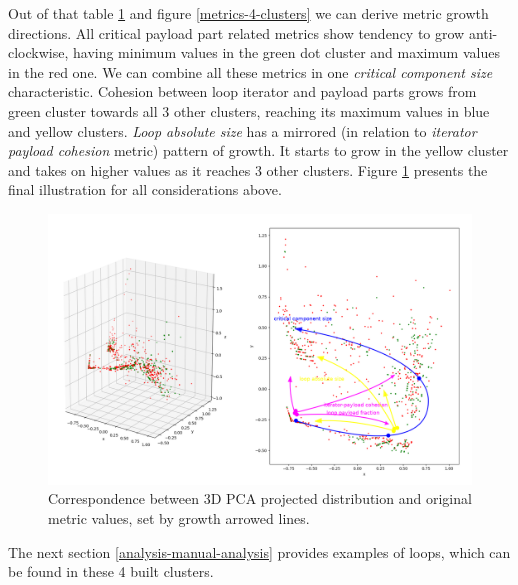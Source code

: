 \null\qquad Out of that table \ref{clusters-metric-values} and figure \ref{metrics-4-clusters} we can derive metric growth directions. All critical payload part related metrics show tendency to grow anti-clockwise, having minimum values in the green dot cluster and maximum values in the red one. We can combine all these metrics in one \textit{critical component size} characteristic. Cohesion between loop iterator and payload parts grows from green cluster towards all 3 other clusters, reaching its maximum values in blue and yellow clusters. \textit{Loop absolute size} has a mirrored (in relation to \textit{iterator payload cohesion} metric) pattern of growth. It starts to grow in the yellow cluster and takes on higher values as it reaches 3 other clusters. Figure \ref{clusters-metric-values} presents the final illustration for all considerations above.\newline   
\begin{figure}[htb]
\centering
\includegraphics[width=\linewidth]{figs/metrics-growth-directions.png}
\caption{Correspondence between 3D PCA projected distribution and original metric values, set by growth arrowed lines.}
\label{clusters-metric-values}
\end{figure}\newline
\null\qquad The next section \ref{analysis-manual-analysis} provides examples of loops, which can be found in these 4 built clusters.  

